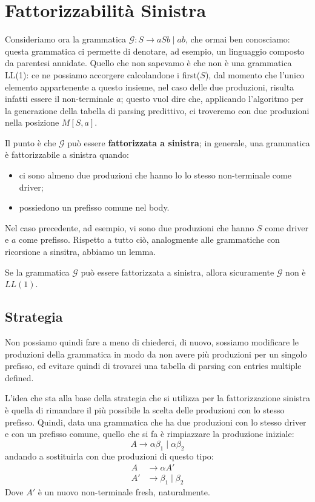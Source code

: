\documentclass[class=book, crop=false, oneside, 12pt]{standalone}
\begin{document}
\section{Fattorizzabilità Sinistra}
Consideriamo ora la grammatica \(\mathcal{G}: S \rightarrow aSb \mid ab\), che ormai ben conosciamo: questa grammatica ci permette di denotare, ad esempio, un linguaggio composto da parentesi annidate. Quello che non sapevamo è che non è una grammatica LL(1): ce ne possiamo accorgere calcolandone i first(\(S\)), dal momento che l'unico elemento appartenente a questo insieme, nel caso delle due produzioni, risulta infatti essere il non-terminale \(a\); questo vuol dire che, applicando l'algoritmo per la generazione della tabella di parsing predittivo, ci troveremo con due produzioni nella posizione \(M[S, a]\).

Il punto è che \(\mathcal{G}\) può essere \textbf{fattorizzata a sinistra}; in generale, una grammatica è fattorizzabile a sinistra quando:
\begin{itemize}
    \item ci sono almeno due produzioni che hanno lo lo stesso non-terminale come driver;
    \item possiedono un prefisso comune nel body.
\end{itemize}
Nel caso precedente, ad esempio, vi sono due produzioni che hanno \(S\) come driver e \(a\) come prefisso. Rispetto a tutto ciò, analogmente alle grammatiche con ricorsione a sinsitra, abbiamo un lemma.

\begin{lemma}
    Se la grammatica \(\mathcal{G}\) può essere fattorizzata a sinistra, allora sicuramente \(\mathcal{G}\) non è \(LL(1)\).    
\end{lemma}

\subsection{Strategia}
Non possiamo quindi fare a meno di chiederci, di nuovo, sossiamo modificare le produzioni della grammatica in modo da non avere più produzioni per un singolo prefisso, ed evitare quindi di trovarci una tabella di parsing con entries multiple defined.

L'idea che sta alla base della strategia che si utilizza per la fattorizzazione sinistra è quella di rimandare il più possibile la scelta delle produzioni con lo stesso prefisso. Quindi, data una grammatica che ha due produzioni con lo stesso driver e con un prefisso comune, quello che si fa è rimpiazzare la produzione iniziale:
\begin{equation*}
    A \rightarrow \alpha \beta_1 \mid \alpha \beta_2  
\end{equation*}
andando a sostituirla con due produzioni di questo tipo:
\begin{align*}
    A &\rightarrow \alpha A' \\
    A' &\rightarrow \beta_1 \mid \beta_2        
\end{align*}
Dove \(A'\) è un nuovo non-terminale fresh, naturalmente.
\end{document}
